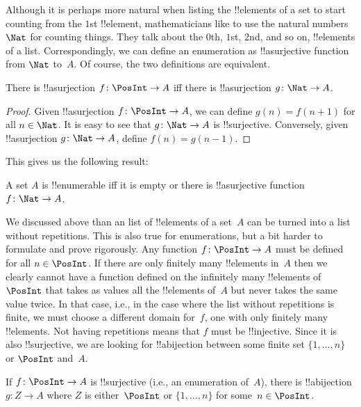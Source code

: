 \documentclass[../../../include/open-logic-section]{subfiles}
\begin{document}
Although it is perhaps more natural when listing the !!{element}s of a
set to start counting from the $1$st !!{element}, mathematicians like
to use the natural numbers~$\Nat$ for counting things. They
talk about the $0$th, $1$st, $2$nd, and so on, !!{element}s of a list.
Correspondingly, we can define an enumeration as !!a{surjective}
function from $\Nat$ to~$A$. Of course, the two definitions are
equivalent.

\begin{prop}
  There is !!a{surjection} $f\colon \PosInt \to A$ iff there is
  !!a{surjection} $g\colon \Nat \to A$.
\end{prop}

\begin{proof}
  Given !!a{surjection} $f\colon \PosInt \to A$, we can define $g(n) =
  f(n+1)$ for all $n \in \Nat$. It is easy to see that $g\colon \Nat
  \to A$ is !!{surjective}. Conversely, given !!a{surjection} $g\colon
  \Nat \to A$, define $f(n) = g(n-1)$.
\end{proof}

This gives us the following result:

\begin{cor}
A set $A$ is !!{enumerable} iff it is empty or there is
!!a{surjective} function $f\colon \Nat \to A$.
\end{cor}

We discussed above than an list of !!{element}s of a set~$A$ can be
turned into a list without repetitions. This is also true for
enumerations, but a bit harder to formulate and prove rigorously. Any
function $f\colon \PosInt \to A$ must be defined for all $n \in
\PosInt$. If there are only finitely many !!{element}s in~$A$ then we
clearly cannot have a function defined on the infinitely many
!!{element}s of~$\PosInt$ that takes as values all the !!{element}s
of~$A$ but never takes the same value twice. In that case, i.e., in
the case where the list without repetitions is finite, we must choose
a different domain for~$f$, one with only finitely many !!{element}s.
Not having repetitions means that $f$ must be !!{injective}. Since it
is also !!{surjective}, we are looking for !!a{bijection} between some
finite set $\{1, \dots, n\}$ or $\PosInt$ and~$A$.

\begin{prop}
If $f\colon \PosInt \to A$ is !!{surjective} (i.e., an enumeration
of~$A$), there is !!a{bijection} $g\colon Z \to A$ where $Z$ is
either~$\PosInt$ or $\{1, \dots, n\}$ for some~$n \in \PosInt$.
\end{prop}
\end{document}
